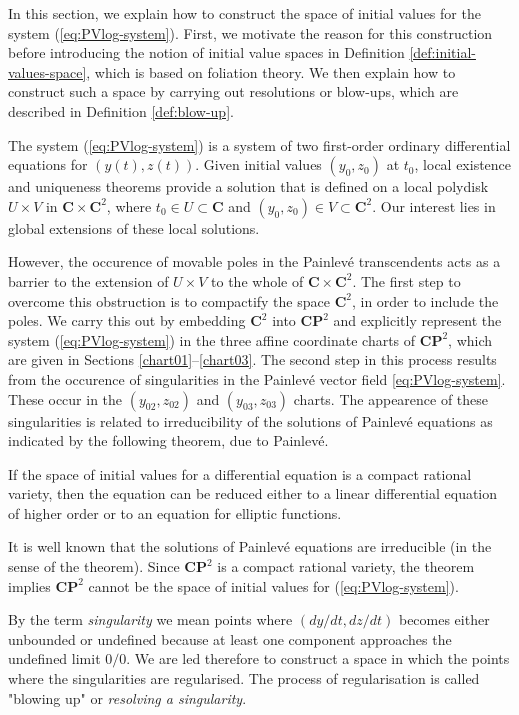 In this section, we explain how to construct the space of initial values for the system (\ref{eq:PVlog-system}).
First, we motivate the reason for this construction before introducing the notion of initial value spaces in Definition \ref{def:initial-values-space}, which is based on foliation theory.
We then explain how to construct such a space by carrying out resolutions or blow-ups, which are described in Definition \ref{def:blow-up}.

The system (\ref{eq:PVlog-system}) is a system of two first-order ordinary differential equations for $(y(t), z(t))$. 
Given initial values $(y_0, z_0)$ at $t_0$, local existence and uniqueness theorems provide a solution that is defined on a local polydisk $U\times V$ in $\mathbf C\times \mathbf C^2$, where $t_0\in U\subset \mathbf C$ and $(y_0, z_0)\in V\subset \mathbf C^2$.
Our interest lies in global extensions of these local solutions.

However, the occurence of movable poles in the Painlev\'e transcendents acts as a barrier to the extension of $U\times V$ to the whole of $\mathbf C\times \mathbf C^2$.
The first step to overcome this obstruction is to compactify the space $\mathbf C^2$, in order to include the poles.
We carry this out by embedding $\mathbf C^2$ into $\mathbf C\mathbf P^2$ and explicitly represent the system (\ref{eq:PVlog-system}) in the three affine coordinate charts of $\mathbf C\mathbf P^2$, which are given in Sections \ref{chart01}--\ref{chart03}.
The second step in this process results from the occurence of singularities in the Painlev\'e vector field \eqref{eq:PVlog-system}.
These occur in the $(y_{02},z_{02})$ and $(y_{03},z_{03})$ charts. 
The appearence of these singularities is related to irreducibility of the solutions of Painlev\'e equations as indicated by the following theorem, due to Painlev\'e. 

\begin{theorem}
If the space of initial values for a differential equation is a compact rational variety, then the equation can be reduced either to a linear differential equation of higher order or to an equation for elliptic functions.
\end{theorem}
It is well known that the solutions of Painlev\'e equations are irreducible (in the sense of the theorem). Since $\mathbf{CP}^2$ is a compact rational variety, the theorem implies $\mathbf{CP}^2$ cannot be the space of initial values for (\ref{eq:PVlog-system}).

By the term {\em singularity} we mean points where $(dy/dt, dz/dt)$ becomes either unbounded or undefined because at least one component approaches the undefined limit $0/0$.
We are led therefore to construct a space in which the points where the singularities are regularised.
The process of regularisation is called "blowing up" or \emph{resolving a singularity}.

